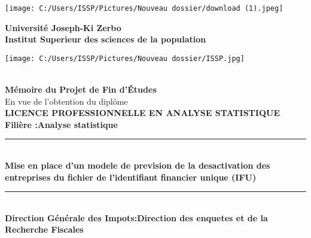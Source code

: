 \documentclass[a4paper,12pt]{report}
\begin{document}
\begin{titlepage}
\begin{center}
	\begin{minipage}{2.5cm}
	\begin{center}
		\texttt{[image: C:/Users/ISSP/Pictures/Nouveau dossier/download (1).jpeg]}
		
	\end{center}
\end{minipage}\hfill
\begin{minipage}{10cm}
	\begin{center}
	\textbf{ Université Joseph-Ki Zerbo}\\[0.1cm]
    \textbf{\uppercase{I}nstitut Superieur des sciences de la population}\\[0.1cm]

	\end{center}
\end{minipage}\hfill
\begin{minipage}{2.5cm}
	\begin{center}
		\texttt{[image: C:/Users/ISSP/Pictures/Nouveau dossier/ISSP.jpg]}
	\end{center}

\end{minipage}

\textsc{\Large }\\[1.5cm]
{\large \bfseries Mémoire du Projet de Fin d'\uppercase{é}tudes}\\[0.5cm]
{\large En vue de l'obtention du diplôme}\\[1cm]

{\huge \bfseries \uppercase{Licence professionnelle en analyse statistique} \\[0.5cm] }
{\large \bfseries Filière :Analyse statistique}
\textsc{\Large }\\[1cm]

\rule{\linewidth}{0.3mm} \\[0.4cm]
{ \huge \bfseries\color{blue!70!black} Mise en place d'un modele de prevision de la desactivation des entreprises du fichier de l'identifiant financier unique (IFU)\\[0.4cm] }
\rule{\linewidth}{0.3mm} \\[1cm]
{\large \bfseries Direction Générale des Impots:Direction des enquetes et de la Recherche Fiscales }\\[1cm]


\end{center}
\end{titlepage}
\end{document}
